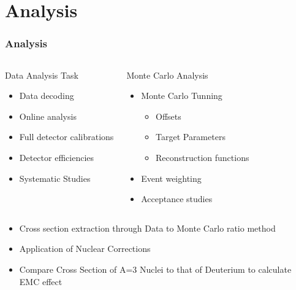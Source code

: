 \documentclass{beamer}
\begin{document}
\section[Analysis]{Analysis}

\begin{frame}
\frametitle{Analysis}
	\begin{columns}
	\begin{block}{Data Analysis Task}
		\begin{itemize}
			\item Data decoding 
			\item Online analysis
			\item Full detector calibrations 
			\item Detector efficiencies
			\item Systematic Studies
		\end{itemize}
	\end{block}
	\begin{block}{Monte Carlo Analysis}
		\begin{itemize}
			\item Monte Carlo Tunning
				\begin{itemize}
					\item Offsets
					\item Target Parameters
					\item Reconstruction functions
				\end{itemize}
			\item Event weighting 
			\item Acceptance studies
			
		\end{itemize}
	\end{block}
	\end{columns}
	\begin{block}{}
		\begin{itemize}
			\item Cross section extraction through Data to Monte Carlo ratio method
			\item Application of Nuclear Corrections
			\item Compare Cross Section of A=3 Nuclei to that of Deuterium to calculate EMC effect 
		\end{itemize}
	\end{block}
\end{frame}
\end{document}
